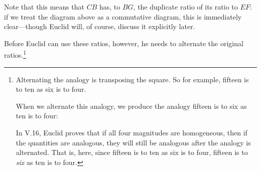 \documentclass[11pt]{article}
\newcommand{\flushleftright}{\noindent\justifying}
\begin{document}
\flushleftright%
Note that this means that $CB$ has, to $BG$, the duplicate ratio of its ratio to $EF$: if we treat the diagram above as a commutative diagram, this is immediately clear---though Euclid will, of course, discuss it explicitly later.

Before Euclid can use these ratios, however, he needs to alternate the original ratios.\footnote{%
Alternating the analogy is transposing the square. So for example, fifteen is to ten as six is to four.

\centering%
%
%

\flushleftright%
When we alternate this analogy, we produce the analogy fifteen is to six as ten is to four:

\centering%

\flushleftright%
In V.16, Euclid proves that if all four magnitudes are homogeneous, then if the quantities are analogous, they will still be analogous after the analogy is alternated. That is, here, since fifteen is to ten as six is to four, fifteen is to \textit{six} as ten is to four.
}
\end{document}
